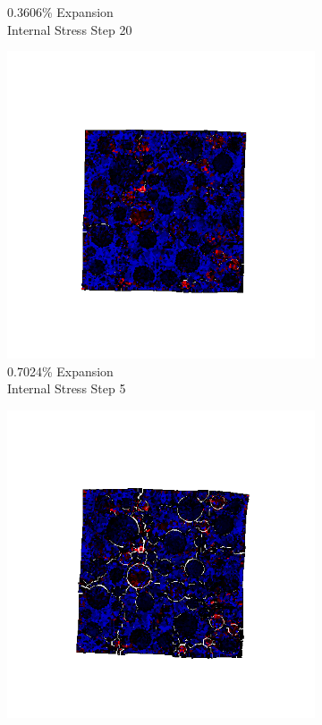 \begin{figure}[ht!]
\begin{subfigure}{.25\textwidth}
      \caption{0.3606\% Expansion\\Internal Stress Step 20}
    \end{subfigure}

    \begin{subfigure}{.25\textwidth}
      \centering
      \includegraphics[width=1.0\linewidth]{Files/exp_3D/ASR/A30P25_3_s5.png}
      \caption{0.7024\% Expansion\\Internal Stress Step 5}
    \end{subfigure}%
    \begin{subfigure}{.25\textwidth}
      \centering
      \includegraphics[width=1.0\linewidth]{Files/exp_3D/ASR/A30P25_3_s10.png}

\end{subfigure}
\end{figure}
